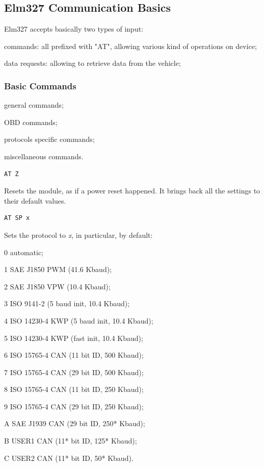 \documentclass[twoside]{article}
\begin{document}
\begin{multicols}{2}
\subsection{Elm327 Communication Basics}

Elm327 accepts basically two types of input:
\begin{compactitem}
  \item commands: all prefixed with "AT", allowing various kind of operations on device;
  \item data requests: allowing to retrieve data from the vehicle;
  
\end{compactitem}

\subsubsection{Basic Commands}

\begin{compactitem}
  \item general commands;
  \item OBD commands;
  \item protocols specific commands;
  \item miscellaneous commands.
\end{compactitem}

\begin{lstlisting}[language=bash]
AT Z
\end{lstlisting}

Resets the module, as if a power reset happened.
It brings back all the settings to their default values.

\begin{lstlisting}[language=bash]
AT SP x
\end{lstlisting}

Sets the protocol to \emph{x}, in particular, by default:
\begin{compactitem}
  \item 0 automatic;
  \item 1 SAE J1850 PWM (41.6 Kbaud);
  \item 2 SAE J1850 VPW (10.4 Kbaud);
  \item 3 ISO 9141-2 (5 baud init, 10.4 Kbaud);
  \item 4 ISO 14230-4 KWP (5 baud init, 10.4 Kbaud);
  \item 5 ISO 14230-4 KWP (fast init, 10.4 Kbaud);
  \item 6 ISO 15765-4 CAN (11 bit ID, 500 Kbaud);
  \item 7 ISO 15765-4 CAN (29 bit ID, 500 Kbaud);
  \item 8 ISO 15765-4 CAN (11 bit ID, 250 Kbaud);
  \item 9 ISO 15765-4 CAN (29 bit ID, 250 Kbaud);
  \item A SAE J1939 CAN (29 bit ID, 250* Kbaud);
  \item B USER1 CAN (11* bit ID, 125* Kbaud);
  \item C USER2 CAN (11* bit ID, 50* Kbaud).
\end{compactitem}



\end{multicols}
\end{document}
